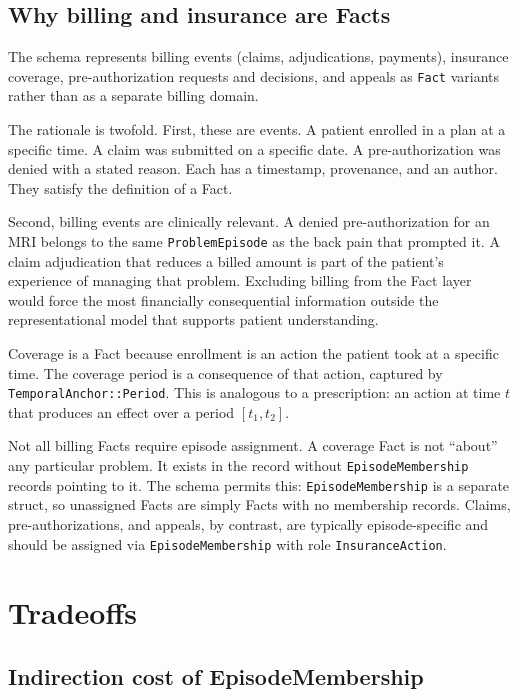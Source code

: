 \documentclass[11pt]{article}
\begin{document}
\subsection{Why billing and insurance are Facts}
\label{sec:billing-rationale}

The schema represents billing events (claims, adjudications, payments),
insurance coverage, pre-authorization requests and decisions, and appeals as
\texttt{Fact} variants rather than as a separate billing domain.

The rationale is twofold. First, these are events. A patient enrolled in a
plan at a specific time. A claim was submitted on a specific date. A
pre-authorization was denied with a stated reason. Each has a timestamp,
provenance, and an author. They satisfy the definition of a Fact.

Second, billing events are clinically relevant. A denied pre-authorization
for an MRI belongs to the same \texttt{ProblemEpisode} as the back pain that
prompted it. A claim adjudication that reduces a billed amount is part of the
patient's experience of managing that problem. Excluding billing from the
Fact layer would force the most financially consequential information outside
the representational model that supports patient understanding.

Coverage is a Fact because enrollment is an action the patient took at a
specific time. The coverage period is a consequence of that action, captured
by \texttt{TemporalAnchor::Period}. This is analogous to a prescription: an
action at time $t$ that produces an effect over a period $[t_1, t_2]$.

Not all billing Facts require episode assignment. A coverage Fact is not
``about'' any particular problem. It exists in the record without
\texttt{EpisodeMembership} records pointing to it. The schema permits this:
\texttt{EpisodeMembership} is a separate struct, so unassigned Facts are
simply Facts with no membership records. Claims, pre-authorizations, and
appeals, by contrast, are typically episode-specific and should be assigned
via \texttt{EpisodeMembership} with role \texttt{InsuranceAction}.

\section{Tradeoffs}
\label{sec:tradeoffs}

\subsection{Indirection cost of EpisodeMembership}
\end{document}
